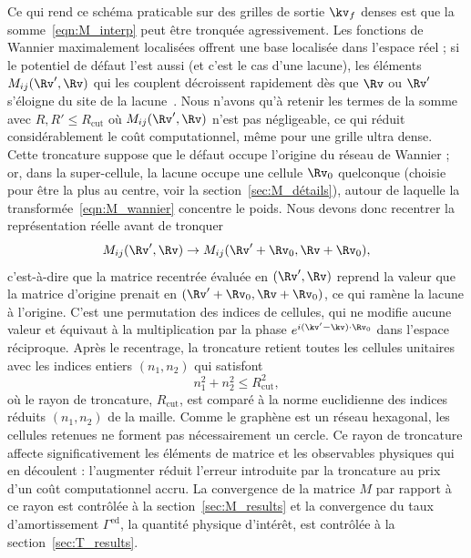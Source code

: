 Ce qui rend ce schéma praticable sur des grilles de sortie $\kv_f$ denses est que la somme~\eqref{eqn:M_interp} peut être tronquée agressivement. Les fonctions de Wannier maximalement localisées offrent une base localisée dans l'espace réel ; si le potentiel de défaut l'est aussi (et c'est le cas d'une lacune), les éléments $M_{ij}(\Rv',\Rv)$ qui les couplent décroissent rapidement dès que $\Rv$ ou $\Rv'$ s'éloigne du site de la lacune~\cite{brouderExponentialLocalizationWannier2007,marzariMaximallyLocalizedWannier2012a}. Nous n'avons qu'à retenir les termes de la somme avec $R,R'\le R_\text{cut}$ où $M_{ij}(\Rv',\Rv)$ n'est pas négligeable, ce qui réduit considérablement le coût computationnel, même pour une grille ultra dense. Cette troncature suppose que le défaut occupe l'origine du réseau de Wannier ; or, dans la super-cellule, la lacune occupe une cellule $\Rv_0$ quelconque (choisie pour être la plus au centre, voir la section~\ref{sec:M_détails}), autour de laquelle la transformée~\eqref{eqn:M_wannier} concentre le poids. Nous devons donc recentrer la représentation réelle avant de tronquer
\begin{equation}
    M_{ij}(\Rv',\Rv)\to M_{ij}(\Rv'+\Rv_0,\Rv+\Rv_0),\label{eqn:M_recentrage}
\end{equation}
c'est-à-dire que la matrice recentrée évaluée en $(\Rv',\Rv)$ reprend la valeur que la matrice d'origine prenait en $(\Rv'+\Rv_0,\Rv+\Rv_0)$, ce qui ramène la lacune à l'origine. C'est une permutation des indices de cellules, qui ne modifie aucune valeur et équivaut à la multiplication par la phase $e^{i(\kv'-\kv)\cdot\Rv_0}$ dans l'espace réciproque. Après le recentrage, la troncature retient toutes les cellules unitaires avec les indices entiers $(n_1,n_2)$ qui satisfont
\begin{equation}
    n_1^2+n_2^2\le R_\text{cut}^2,
\end{equation}
où le rayon de troncature, $R_\text{cut}$, est comparé à la norme euclidienne des indices réduits $(n_1,n_2)$ de la maille. Comme le graphène est un réseau hexagonal, les cellules retenues ne forment pas nécessairement un cercle. Ce rayon de troncature affecte significativement les éléments de matrice et les observables physiques qui en découlent : l'augmenter réduit l'erreur introduite par la troncature au prix d'un coût computationnel accru. La convergence de la matrice $M$ par rapport à ce rayon est contrôlée à la section~\ref{sec:M_results} et la convergence du taux d'amortissement $\Gamma^\text{ed}$, la quantité physique d'intérêt, est contrôlée à la section~\ref{sec:T_results}.

